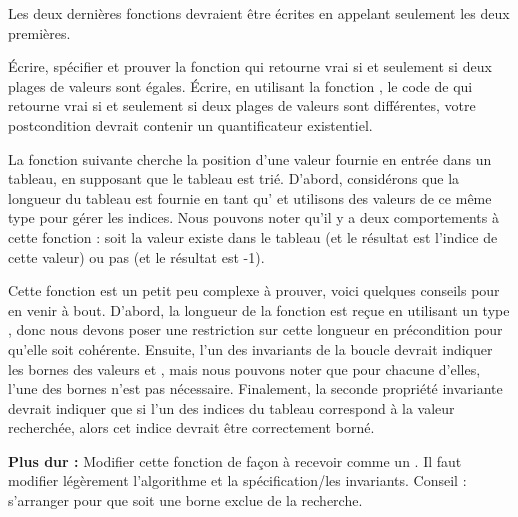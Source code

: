 Les deux dernières fonctions devraient être écrites en appelant seulement les deux
premières.




Écrire, spécifier et prouver la fonction  qui retourne vrai
si et seulement si deux plages de valeurs sont égales. Écrire, en utilisant la
fonction , le code de  qui retourne vrai
si et seulement si deux plages de valeurs sont différentes, votre postcondition
devrait contenir un quantificateur existentiel.




\label{l4:statements-loops-ex-bsearch}


La fonction suivante cherche la position d'une valeur fournie en entrée dans
un tableau, en supposant que le tableau est trié. D'abord, considérons que la
longueur du tableau est fournie en tant qu' et utilisons des valeurs de ce
même type pour gérer les indices. Nous pouvons noter qu'il y a deux comportements
à cette fonction : soit la valeur existe dans le tableau (et le résultat est
l'indice de cette valeur) ou pas (et le résultat est -1).




Cette fonction est un petit peu complexe à prouver, voici quelques conseils
pour en venir à bout. D'abord, la longueur de la fonction est reçue en utilisant
un type , donc nous devons poser une restriction sur cette longueur en
précondition pour qu'elle soit cohérente. Ensuite, l'un des invariants de la
boucle devrait indiquer les bornes des valeurs  et
, mais nous pouvons noter que pour chacune d'elles, l'une des
bornes n'est pas nécessaire. Finalement, la seconde propriété invariante
devrait indiquer que si l'un des indices du tableau correspond à la valeur
recherchée, alors cet indice devrait être correctement borné.


\textbf{Plus dur :} Modifier cette fonction de façon à recevoir 
comme un . Il faut modifier légèrement l'algorithme et
la spécification/les invariants. Conseil : s'arranger pour que 
soit une borne exclue de la recherche.




